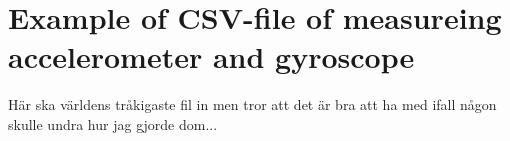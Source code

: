 \chapter{Example of CSV-file of measureing accelerometer and gyroscope}\label{csvraw}

Här ska världens tråkigaste fil in men tror att det är bra att ha med ifall någon skulle undra hur jag gjorde dom...